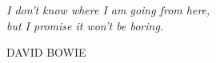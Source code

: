 \clearpage
\thispagestyle{empty}
\null\vfill

\begin{center}
\parbox{0.75\linewidth}{%
	\raggedright{\Large\itshape%
		I don't know where I am going from here, \\
		but I promise it won't be boring.\par\bigskip
	}   
	\raggedleft\Large\MakeUppercase{David Bowie}\par%
}
\end{center}
\vfill\vfill
\clearpage